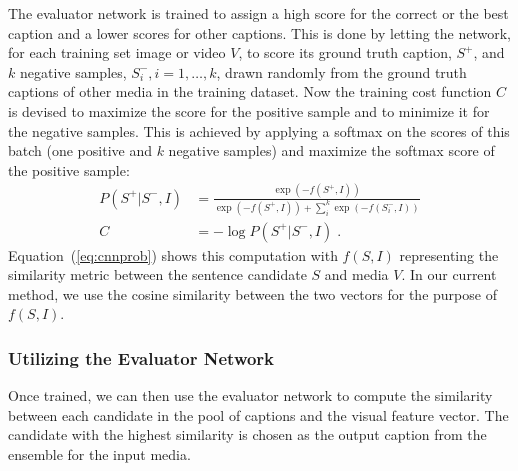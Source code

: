 The evaluator network is trained to assign a high score for the correct or the
best caption and a lower scores for other captions.
This is done by letting the network, for each training set image or video $V$,
to score its ground truth caption, $S^+$, and $k$ negative samples, $S_i^-,
i=1,\ldots,k$, drawn randomly from the ground truth captions of other media in
the training dataset.
Now the training cost function $C$ is devised to maximize the score for the
positive sample and to minimize it for the negative samples. 
This is achieved by applying a softmax on the scores of this batch (one positive
and $k$ negative samples) and maximize the softmax score
of the positive sample:
\begin{align}
  \label{eq:cnnprob} 
  P(S^+|S^-,I) &= \frac{\exp(-f(S^+,I))}{\exp(-f(S^+,I)) +
           \sum\limits_i^k{\exp(-f(S_i^- ,I))}} \\
  C &= -\log P(S^+|S^-,I) \;.
\end{align}
Equation~(\ref{eq:cnnprob}) shows this computation with $f(S,I)$ representing
the similarity metric between the sentence candidate $S$ and media $V$.
In our current method, we use the cosine similarity between the two vectors for
the purpose of $f(S,I)$.


\subsubsection{Utilizing the Evaluator Network}

Once trained, we can then use the evaluator network to compute the similarity
between each candidate in the pool of captions and the visual feature vector. 
The candidate with the highest similarity is chosen as the output caption from
the ensemble for the input media.

